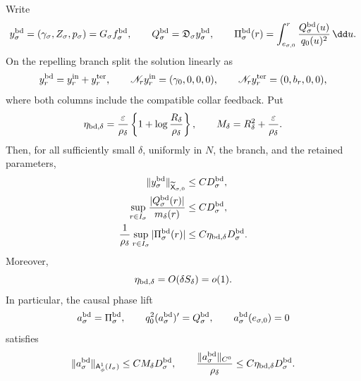 \begin{proposition}
Write
\begin{equation}
 y_{\sigma}^{\rm bd}
   =(\gamma_\sigma,Z_\sigma,p_\sigma)
   =G_\sigma f_{\sigma}^{\rm bd},\qquad
 Q_{\sigma}^{\rm bd}=\mathfrak D_\sigma y_{\sigma}^{\rm bd},
 \qquad
 \Pi_{\sigma}^{\rm bd}(r)
   =\int_{e_{\sigma,0}}^r
       \frac{Q_{\sigma}^{\rm bd}(u)}{q_0(u)^2}\,\dd u .      \label{eq:boundary-column-returned-data}
\end{equation}
On the repelling branch split the solution linearly as
\begin{equation}
 y_r^{\rm bd}=y_r^{\rm in}+y_r^{\rm ter},\qquad
 \mathscr N_ry_r^{\rm in}=(\gamma_0,0,0,0),\qquad
 \mathscr N_ry_r^{\rm ter}=(0,b_r,0,0),          \label{eq:boundary-column-repelling-split}
\end{equation}
where both columns include the compatible collar feedback.  Put
\begin{equation}
 \eta_{{\rm bd},\delta}
 =\frac{\varepsilon}{\rho_\delta}
    \left\{1+\log\frac{R_\delta}{\rho_\delta}\right\},
 \qquad
 M_\delta=R_\delta^2+\frac{\varepsilon}{\rho_\delta}.
                                                        \label{eq:boundary-column-small-numbers}
\end{equation}
Then, for all sufficiently small \(\delta\), uniformly in \(N\), the
branch, and the retained parameters,
\begin{align}
 \|y_{\sigma}^{\rm bd}\|_{\widetilde{\mathsf X}_{\sigma,0}}
 &\le C D_{\sigma}^{\rm bd},\notag\\
 \sup_{r\in I_\sigma}
     \frac{|Q_{\sigma}^{\rm bd}(r)|}{m_\delta(r)}
 &\le C D_{\sigma}^{\rm bd},\notag\\
 \frac1{\rho_\delta}
   \sup_{r\in I_\sigma}|\Pi_{\sigma}^{\rm bd}(r)|
 &\le C\eta_{{\rm bd},\delta}D_{\sigma}^{\rm bd}.          \label{eq:boundary-column-global-action}
\end{align}
Moreover,
\begin{equation}
 \eta_{{\rm bd},\delta}=O(\delta S_\delta)=o(1).             \label{eq:boundary-column-action-smallness}
\end{equation}
In particular, the causal phase lift
\begin{equation}
 a_{\sigma}^{\rm bd}=\Pi_{\sigma}^{\rm bd},\qquad
 q_0^2(a_{\sigma}^{\rm bd})'=Q_{\sigma}^{\rm bd},\qquad
 a_{\sigma}^{\rm bd}(e_{\sigma,0})=0              \label{eq:boundary-column-causal-phase-lift}
\end{equation}
satisfies
\begin{equation}
 \|a_{\sigma}^{\rm bd}\|_{\mathsf A_\phi^1(I_\sigma)}
 \le C M_\delta D_{\sigma}^{\rm bd},\qquad
 \frac{\|a_{\sigma}^{\rm bd}\|_{C^0}}{\rho_\delta}
 \le C\eta_{{\rm bd},\delta}D_{\sigma}^{\rm bd}.          \label{eq:boundary-column-phase-lift-bound}
\end{equation}


\end{proposition}
